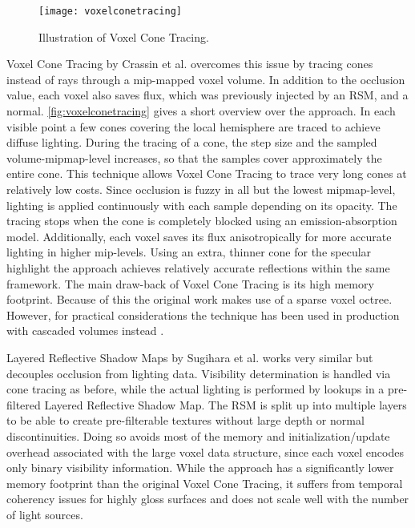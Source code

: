 \documentclass[thesis.tex]{subfiles}
\begin{document}
\begin{figure}[h]
\centering
 \texttt{[image: voxelconetracing]}
\caption{\cite{bib:voxelconetracing} Illustration of Voxel Cone Tracing. } \label{fig:voxelconetracing}
\end{figure}
Voxel Cone Tracing by Crassin et al. \cite{bib:voxelconetracing} overcomes this issue by tracing cones instead of rays through a mip-mapped voxel volume.
In addition to the occlusion value, each voxel also saves flux, which was previously injected by an RSM, and a normal.
\autoref{fig:voxelconetracing} gives a short overview over the approach.
In each visible point a few cones covering the local hemisphere are traced to achieve diffuse lighting.
During the tracing of a cone, the step size and the sampled volume-mipmap-level increases, so that the samples cover approximately the entire cone.
This technique allows Voxel Cone Tracing to trace very long cones at relatively low costs.
Since occlusion is fuzzy in all but the lowest mipmap-level, lighting is applied continuously with each sample depending on its opacity.
The tracing stops when the cone is completely blocked using an emission-absorption model.
Additionally, each voxel saves its flux anisotropically for more accurate lighting in higher mip-levels.
Using an extra, thinner cone for the specular highlight the approach achieves relatively accurate reflections within the same framework.
The main draw-back of Voxel Cone Tracing is its high memory footprint.
Because of this the original work makes use of a sparse voxel octree.
However, for practical considerations the technique has been used in production with cascaded volumes instead \cite{bib:fumufu:vct}.

Layered Reflective Shadow Maps by Sugihara et al. \cite{bib:layeredrsm} works very similar but decouples occlusion from lighting data.
Visibility determination is handled via cone tracing as before, while the actual lighting is performed by lookups in a pre-filtered Layered Reflective Shadow Map.
The RSM is split up into multiple layers to be able to create pre-filterable textures without large depth or normal discontinuities.
Doing so avoids most of the memory and initialization/update overhead associated with the large voxel data structure, since each voxel encodes only binary visibility information.
While the approach has a significantly lower memory footprint than the original Voxel Cone Tracing, it suffers from temporal coherency issues for highly gloss surfaces and does not scale well with the number of light sources.
\end{document}

